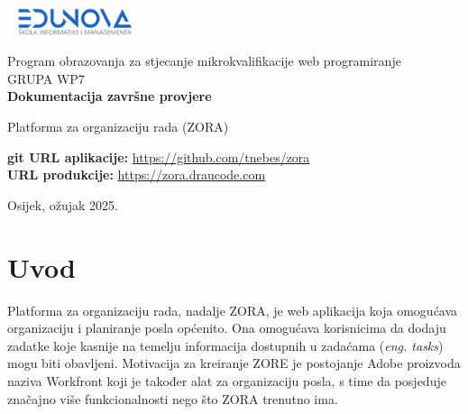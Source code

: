 \documentclass[a4paper,12pt]{article}
\begin{document}
\begin{center}
    \includegraphics[width=0.3\textwidth]{edunova_logo.png}
\end{center}

\begin{center}
    {\Large Program obrazovanja za stjecanje mikrokvalifikacije web programiranje}\\[2ex]
    GRUPA WP7\\[2ex]
    \vspace{10em}
    {\Huge \textbf{Dokumentacija završne provjere}}\\[2ex]

\end{center}

\begin{center}
    \vspace{2em}
    {\Large {Platforma za organizaciju rada (ZORA)}}\\[2ex]
\end{center}

\begin{center}
    \vspace{2em}
    \noindent\textbf{git URL aplikacije:} \url{https://github.com/tnebes/zora}\\[1ex]
    \textbf{URL produkcije:} \url{https://zora.draucode.com}
\end{center}

\vspace{2cm}

\begin{center}
\end{center}

\vfill
\begin{center}
    {\large Osijek, ožujak 2025.}
\end{center}

\newpage

\tableofcontents
\newpage

\section{Uvod}

Platforma za organizaciju rada, nadalje ZORA, je web aplikacija koja omogućava organizaciju i planiranje posla općenito. Ona omogućava korisnicima da dodaju zadatke koje kasnije na temelju informacija dostupnih u zadaćama (\emph{eng. tasks}) mogu biti obavljeni. Motivacija za kreiranje ZORE je postojanje Adobe proizvoda naziva Workfront koji je također alat za organizaciju posla, s time da posjeduje značajno više funkcionalnosti nego što ZORA trenutno ima.
\end{document}
